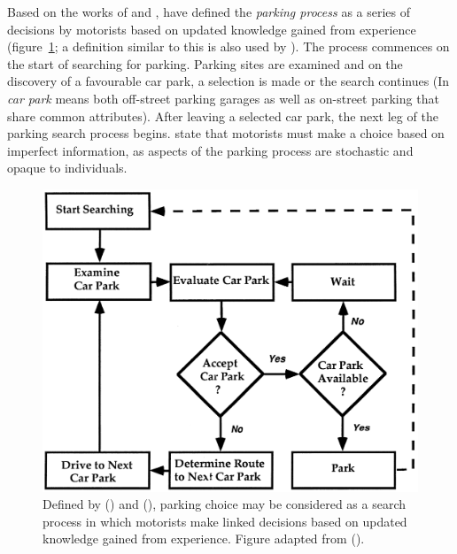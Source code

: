 Based on the works of  and ,  have defined the \textit{parking process} as a series of decisions by motorists based on updated knowledge gained from experience (figure~\ref{fig:parking-process-thompson}; a definition similar to this is also used by ). The process commences on the start of searching for parking. Parking sites are examined and on the discovery of a favourable car park, a selection is made or the search continues (In  \textit{car park} means both off-street parking garages as well as on-street parking that share common attributes). After leaving a selected car park, the next leg of the parking search process begins. \citeauthor{Thompson1998} state that motorists must make a choice based on imperfect information, as aspects of the parking process are stochastic and opaque to individuals.

\begin{figure}[H]%
    \centering
    \includegraphics[width=.75\textwidth]{images/thesis_parking_search_process_thompson1998.PNG}
    \caption[Parking search process]{Defined by \citeauthor{Layzell1985} (\citeyear{Layzell1985}) and \citeauthor{Polak1989} (\citeyear{Polak1989}), parking choice may be considered as a search process in which motorists make linked decisions based on updated knowledge gained from experience. Figure adapted from \citeauthor{Thompson1998} (\citeyear{Thompson1998}).}%
    \label{fig:parking-process-thompson}%
\end{figure}

